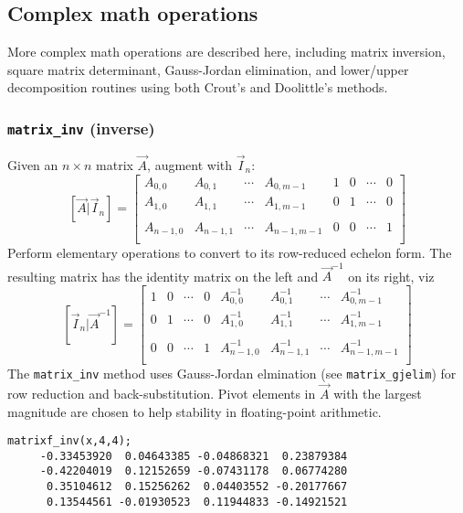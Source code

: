 % 
%
\subsection{Complex math operations}
\label{module:matrix:complex}
More complex math operations are described here, including matrix inversion,
square matrix determinant,
Gauss-Jordan elimination, and lower/upper decomposition routines using both
Crout's and Doolittle's methods.

\subsubsection{{\tt matrix\_inv} (inverse)}
\label{module:matrix:inv}
Given an $n \times n$ matrix $\vec{A}$, augment with $\vec{I}_n$:
\[
    \left[\vec{A}|\vec{I}_n\right] = 
    \left[
    \begin{array}{cccc|cccc}
    A_{0,0}     & A_{0,1}   & \cdots  & A_{0,m-1}   & 1 & 0 & \cdots & 0 \\
    A_{1,0}     & A_{1,1}   & \cdots  & A_{1,m-1}   & 0 & 1 & \cdots & 0 \\
                &           &         &             &   &   &        &   \\
    A_{n-1,0}   & A_{n-1,1} & \cdots  & A_{n-1,m-1} & 0 & 0 & \cdots & 1 \\
    \end{array}
    \right]
\]
Perform elementary operations to convert to its row-reduced echelon form.
The resulting matrix has the identity matrix on the left and $\vec{A}^{-1}$ on
its right, viz
\[
    \left[\vec{I}_n|\vec{A}^{-1}\right] = 
    \left[
    \begin{array}{cccc|cccc}
1 & 0 & \cdots & 0 & A^{-1}_{0,0}   & A^{-1}_{0,1}   & \cdots  & A^{-1}_{0,m-1}   \\
0 & 1 & \cdots & 0 & A^{-1}_{1,0}   & A^{-1}_{1,1}   & \cdots  & A^{-1}_{1,m-1}   \\
  &   &        &   &                &                &         &                  \\
0 & 0 & \cdots & 1 & A^{-1}_{n-1,0} & A^{-1}_{n-1,1} & \cdots  & A^{-1}_{n-1,m-1} \\
    \end{array}
    \right]
\]
The {\tt matrix\_inv} method uses Gauss-Jordan elmination (see 
{\tt matrix\_gjelim}) for row reduction and back-substitution.
Pivot elements in $\vec{A}$ with the largest magnitude are chosen to help
stability in floating-point arithmetic.
\begin{Verbatim}[fontsize=\small]
    matrixf_inv(x,4,4);
     -0.33453920  0.04643385 -0.04868321  0.23879384
     -0.42204019  0.12152659 -0.07431178  0.06774280
      0.35104612  0.15256262  0.04403552 -0.20177667
      0.13544561 -0.01930523  0.11944833 -0.14921521
\end{Verbatim}

